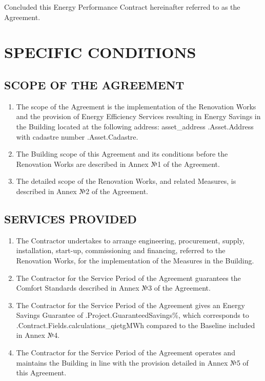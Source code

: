 Concluded this Energy Performance Contract hereinafter referred to as the Agreement.

\section{SPECIFIC CONDITIONS}
\subsection{SCOPE OF THE AGREEMENT}
\begin{enumerate}
	\item	The scope of the Agreement is the implementation of the Renovation Works and the provision of Energy Efficiency Services resulting in Energy Savings in the Building located at the following address: {{asset_address .Asset.Address}} with cadastre number {{.Asset.Cadastre}}.
	\item	The Building scope of this Agreement and its conditions before the Renovation Works are described in Annex №1 of the Agreement.
	\item	The detailed scope of the Renovation Works, and related Measures, is described in Annex №2 of the Agreement.
\end{enumerate}

\subsection{SERVICES PROVIDED}
\begin{enumerate}
	\item	The Contractor undertakes to arrange engineering, procurement, supply, installation, start-up, commissioning and financing, referred to the Renovation Works, for the implementation of the Measures in the Building.
	\item	The Contractor for the Service Period of the Agreement guarantees the Comfort Standards described in Annex №3 of the Agreement.
  \item	The Contractor for the Service Period of the Agreement gives an Energy Savings Guarantee of {{.Project.GuaranteedSavings}}\%, which corresponds to {{.Contract.Fields.calculations_qietg}}MWh compared to the Baseline included in Annex №4.
	\item	The Contractor for the Service Period of the Agreement operates and maintains the Building in line with the provision detailed in Annex №5 of this Agreement.
\end{enumerate}

